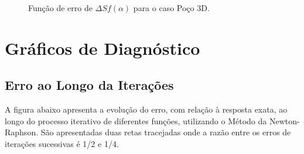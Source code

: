 \documentclass[final,3p,12pt]{elsarticle}
\begin{document}
\begin{figure}[hbt!] 
    \label{fig:fpoco3d}
    \centering
    \caption{Função de erro de $\Delta S f(\alpha)$ para o caso Poço 3D.}
\end{figure}

\FloatBarrier
\newpage
\section{Gráficos de Diagnóstico}

\subsection{Erro ao Longo da Iterações}

A figura abaixo apresenta a evolução do erro, com relação à resposta exata, ao longo do processo iterativo de diferentes funções, utilizando o Método da Newton-Raphson. São apresentadas duas retas tracejadas onde a razão entre os erros de iterações sucessivas é 1/2 e 1/4.
\end{document}
